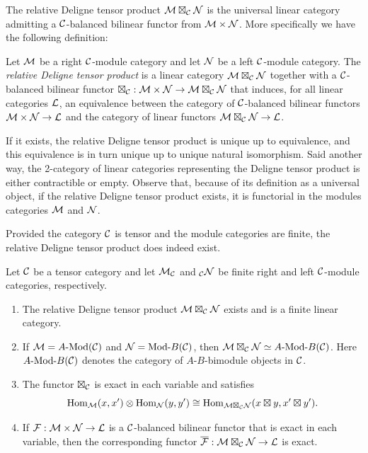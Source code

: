 \documentclass{amsart}
\begin{document}
The relative Deligne tensor product $\mathcal M \boxtimes_{\mathcal C} \mathcal N$ is the universal linear category admitting a $\mathcal C$-balanced bilinear functor from $\mathcal M \times \mathcal N$.  More specifically we have the following definition:

\begin{definition}
	Let $\mathcal M$ be a right $\mathcal C$-module category and let $\mathcal N$ be a left $\mathcal C$-module category.  The {\em relative Deligne tensor product} is a linear category $\mathcal M \boxtimes_{\mathcal C} \mathcal N$ together with a $\mathcal C$-balanced bilinear functor $\boxtimes_{\mathcal C}: \mathcal M \times \mathcal N \to \mathcal M \boxtimes_{\mathcal C} \mathcal N$ that induces, for all linear categories $\mathcal L$, an equivalence between the category of $\mathcal C$-balanced bilinear functors $\mathcal M \times \mathcal N \to \mathcal L$ and the category of linear functors $\mathcal M \boxtimes_{\mathcal C} \mathcal N \to \mathcal L$. 
\end{definition}

\noindent If it exists, the relative Deligne tensor product is unique up to equivalence, and this equivalence is in turn unique up to unique natural isomorphism. Said another way, the 2-category of linear categories representing the Deligne tensor product is either contractible or empty.  Observe that, because of its definition as a universal object, if the relative Deligne tensor product exists, it is functorial in the modules categories $\mathcal M$ and $\mathcal N$. 

Provided the category $\mathcal C$ is tensor and the module categories are finite, the relative Deligne tensor product does indeed exist.

\begin{theorem} \label{thm:DelignePrdtOverATCExists}
	Let $\mathcal C$ be a tensor category and let $\mathcal M_{\mathcal C}$ and ${}_{\mathcal C}\mathcal N$ be finite right and left $\mathcal C$-module categories, respectively. 
	\begin{enumerate}
		\item The relative Deligne tensor product $\mathcal M \boxtimes_{\mathcal C} \mathcal N$ exists and is a finite linear category.
		\item If $\cM = \Mod{A}{}(\cC)$ and $\cN = \Mod{}{B}(\cC)$, then $\cM \boxtimes_{\cC} \cN \simeq \Mod{A }{B}(\cC)$. Here $\Mod{A}{B}(\cC)$ denotes the category of $A$-$B$-bimodule objects in $\mathcal C$.

		\item The functor $\boxtimes_{\mathcal C}$ is exact in each variable and satisfies 
		\begin{equation*}
			\operatorname{Hom}_{\mathcal M}(x,x') \otimes \operatorname{Hom}_{\mathcal N}(y, y') \cong \operatorname{Hom}_{\mathcal M \boxtimes_{\mathcal C} \mathcal N} (x \boxtimes y, x' \boxtimes y').
		\end{equation*}
		\item If $\mathcal F: \mathcal M \times \mathcal N \to \mathcal L$ is a $\mathcal C$-balanced bilinear functor that is exact in each variable, then the corresponding functor $\overline{\mathcal F}: \mathcal M \boxtimes_{\mathcal C} \mathcal N \to \mathcal L$ is exact. 
	\end{enumerate} 	
\end{theorem}
\end{document}
